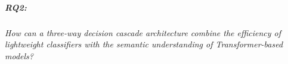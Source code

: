 \documentclass[a4paper,fleqn]{cas-dc}
\begin{document}
\subparagraph{RQ2:} \emph{How can a three-way decision cascade architecture combine the efficiency of lightweight classifiers with the semantic understanding of Transformer-based models?}


%
%
%
%
%
\end{document}
